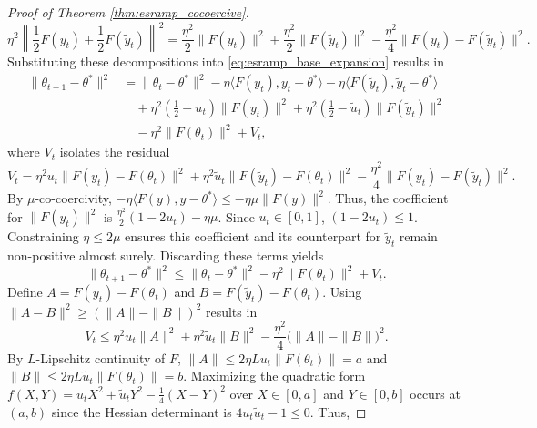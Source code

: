 \documentclass[letter,11pt]{article}
\begin{document}
\begin{proof}[Proof of Theorem \ref{thm:esramp_cocoercive}]
\begin{equation}
\eta^2 \left\| \frac{1}{2} F(y_t) + \frac{1}{2} F(\tilde{y}_t) \right\|^2 = \frac{\eta^2}{2} \|F(y_t)\|^2 + \frac{\eta^2}{2} \|F(\tilde{y}_t)\|^2 - \frac{\eta^2}{4} \|F(y_t) - F(\tilde{y}_t)\|^2.
\end{equation}
Substituting these decompositions into \eqref{eq:esramp_base_expansion} results in
\begin{equation} \label{eq:esramp_grouped}
\begin{aligned}
\|\theta_{t+1} - \theta^*\|^2 &= \|\theta_t - \theta^*\|^2 - \eta \langle F(y_t), y_t - \theta^* \rangle - \eta \langle F(\tilde{y}_t), \tilde{y}_t - \theta^* \rangle \\
&\quad + \eta^2 \left( \frac{1}{2} - u_t \right) \|F(y_t)\|^2 + \eta^2 \left( \frac{1}{2} - \tilde{u}_t \right) \|F(\tilde{y}_t)\|^2 \\
&\quad - \eta^2 \|F(\theta_t)\|^2 + V_t,
\end{aligned}
\end{equation}
where $V_t$ isolates the residual
\begin{equation}
V_t = \eta^2 u_t \|F(y_t) - F(\theta_t)\|^2 + \eta^2 \tilde{u}_t \|F(\tilde{y}_t) - F(\theta_t)\|^2 - \frac{\eta^2}{4} \|F(y_t) - F(\tilde{y}_t)\|^2.
\end{equation}
By $\mu$-co-coercivity, $-\eta \langle F(y), y - \theta^* \rangle \le -\eta\mu \|F(y)\|^2$. Thus, the coefficient for $\|F(y_t)\|^2$ is $\frac{\eta^2}{2}(1 - 2u_t) - \eta\mu$. Since $u_t \in [0, 1]$, $(1 - 2u_t) \le 1$. Constraining $\eta \le 2\mu$ ensures this coefficient and its counterpart for $\tilde{y}_t$ remain non-positive almost surely. Discarding these terms yields
\begin{equation} \label{eq:esramp_variance_isolation}
\|\theta_{t+1} - \theta^*\|^2 \le \|\theta_t - \theta^*\|^2 - \eta^2 \|F(\theta_t)\|^2 + V_t.
\end{equation}
Define $A = F(y_t) - F(\theta_t)$ and $B = F(\tilde{y}_t) - F(\theta_t)$. Using $\|A - B\|^2 \ge (\|A\| - \|B\|)^2$ results in
\begin{equation}
V_t \le \eta^2 u_t \|A\|^2 + \eta^2 \tilde{u}_t \|B\|^2 - \frac{\eta^2}{4} \big( \|A\| - \|B\| \big)^2.
\end{equation}
By $L$-Lipschitz continuity of $F$, $\|A\| \le 2\eta L u_t \|F(\theta_t)\| = a$ and $\|B\| \le 2\eta L \tilde{u}_t \|F(\theta_t)\| = b$.  Maximizing the quadratic form $f(X,Y) = u_t X^2 + \tilde{u}_t Y^2 - \frac{1}{4}(X-Y)^2$ over $X \in [0, a]$ and $Y \in [0, b]$ occurs at $(a, b)$ since the Hessian determinant is $4u_t\tilde{u}_t - 1 \le 0$. Thus,

\end{proof}
\end{document}
